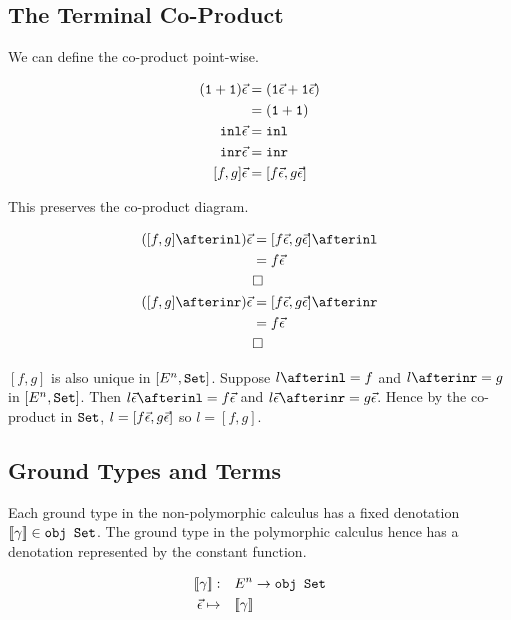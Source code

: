     \subsection{The Terminal Co-Product}
    
    We can define the co-product point-wise.
    
    \begin{align*}
        (\texttt{1} + \texttt{1})\vec{\epsilon} & = (\texttt{1}\vec{\epsilon} + \texttt{1}\vec{\epsilon})\\
        & = (\texttt{1} + \texttt{1})\\
        \texttt{inl}\vec{\epsilon} &= \texttt{inl}\\
        \texttt{inr}\vec{\epsilon} &= \texttt{inr}\\
        [f, g]\vec{\epsilon} &= [f\vec{\epsilon}, g\vec{\epsilon}]\\
    \end{align*}
    
    This preserves the co-product diagram.
    
    \begin{align*}
        ([f, g]\after\inl)\ev & = [f\ev, g\ev]\after \inl\\
        & = f\ev\\
        & \square\\
        ([f, g]\after\inr)\ev& = [f\ev, g\ev]\after \inr\\
        & = f\ev\\
        & \square\\
    \end{align*}
    
    $[f, g]$ is also unique in $[E^n, \texttt{Set}]$. Suppose $l \after \inl = f$ and $l\after \inr = g$ in $[E^n, \texttt{Set}]$. Then $l\ev \after \inl = f\ev$ and $l\ev \after\inr = g\ev$. Hence by the co-product in $\texttt{Set}$, $l = [f\vec{\epsilon}, g\vec{\epsilon}]$ so $l = [f, g]$.
    
    
    \subsection{Ground Types and Terms}
    Each ground type in the non-polymorphic calculus has a fixed denotation ${\bf [\![}\gamma{\bf ]\!]}\in\texttt{obj }\texttt{Set}$. The ground type in the polymorphic calculus hence has a denotation represented by the constant function.
    
    \begin{align*}
        {\bf [\![}\gamma{\bf ]\!]}:&\quad E^n\rightarrow \texttt{obj }\texttt{Set}\\
        \vec{\epsilon} \mapsto&\quad  {\bf [\![}\gamma{\bf ]\!]}\\
    \end{align*}
    
